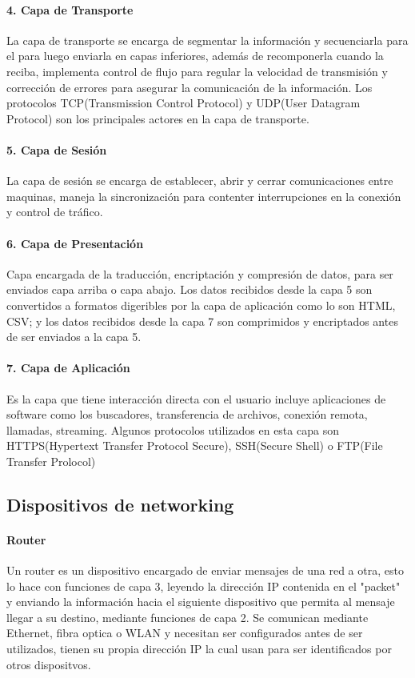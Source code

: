   \paragraph{4. Capa de Transporte}
  La capa de transporte se encarga de segmentar la información y secuenciarla para el para luego enviarla
  en capas inferiores, además de recomponerla cuando la reciba, implementa control de flujo para regular
  la velocidad de transmisión y corrección de errores para asegurar la comunicación de la información.\cite{osi_aws}
  Los protocolos TCP(Transmission Control Protocol) y UDP(User Datagram Protocol) son los principales
  actores en la capa de transporte.
  \paragraph{5. Capa de Sesión}
  La capa de sesión se encarga de establecer, abrir y cerrar comunicaciones entre maquinas,
  maneja la sincronización para contenter interrupciones en la conexión y control de tráfico.\cite{osi_aws}
  \paragraph{6. Capa de Presentación}
  Capa encargada de la traducción, encriptación y compresión de datos, para ser enviados capa arriba o capa abajo.
  Los datos recibidos desde la capa 5 son convertidos a formatos digeribles por la capa de aplicación como lo son HTML, CSV; 
  y los datos recibidos desde la capa 7 son comprimidos y encriptados antes de ser enviados a la capa 5.
  \paragraph{7. Capa de Aplicación}
  Es la capa que tiene interacción directa con el usuario incluye aplicaciones de software como los buscadores,
  transferencia de archivos, conexión remota, llamadas, streaming.
  Algunos protocolos utilizados en esta capa son 
  HTTPS(Hypertext Transfer Protocol Secure), SSH(Secure Shell) o FTP(File Transfer Prolocol)\cite{osi_Haryana_India}
\subsection{Dispositivos de networking}
  \paragraph{Router}
  Un router es un dispositivo encargado de enviar mensajes de una red a otra, esto lo hace con funciones de capa 3,
  leyendo la dirección IP contenida en el "packet" y enviando la información hacia el siguiente dispositivo que permita
  al mensaje llegar a su destino, mediante funciones de capa 2. Se comunican mediante Ethernet, fibra optica o WLAN y necesitan ser configurados antes de ser
  utilizados, tienen su propia dirección IP la cual usan para ser identificados por otros dispositvos.\cite{cloudflare_router}
